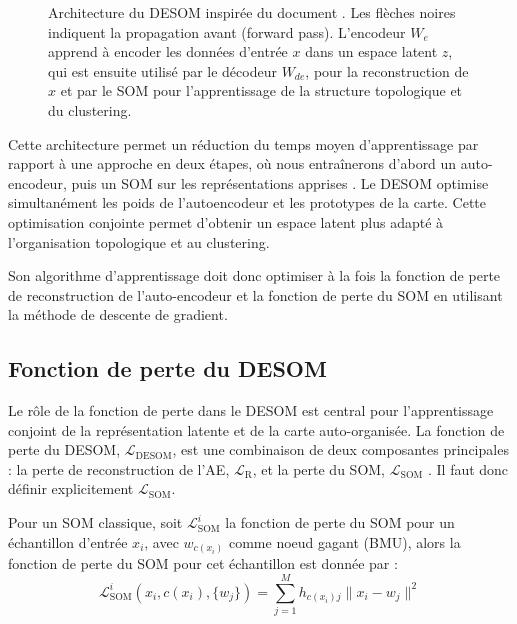 \documentclass[12pt,a4paper]{report}
\begin{document}
\begin{figure}[H]
\caption{Architecture du DESOM inspirée du document \cite{DESOM}. Les flèches noires indiquent la propagation avant (forward pass). 
L'encodeur $ W_e $ apprend à encoder les données d'entrée $x$ dans un espace latent $z$, qui est ensuite utilisé par le décodeur $ W_{de} $, 
pour la reconstruction de $x$ et par le SOM pour l'apprentissage de la structure topologique et du clustering.}
\label{fig:desom_architecture_forw}
\end{figure}

Cette architecture permet un réduction du temps moyen d'apprentissage par rapport à une approche en deux étapes, où nous entraînerons d'abord un auto-encodeur, 
puis un SOM sur les représentations apprises \cite{DESOM}. Le DESOM optimise simultanément les poids de l'autoencodeur et les prototypes de la carte. 
Cette optimisation conjointe permet d'obtenir un espace latent plus adapté à l'organisation topologique et au clustering.

Son algorithme d'apprentissage doit donc optimiser à la fois la fonction de perte de reconstruction de l'auto-encodeur et la fonction de perte du SOM en utilisant la méthode de descente de gradient.

\subsection{Fonction de perte du DESOM}

Le rôle de la fonction de perte dans le DESOM est central pour l'apprentissage conjoint de la représentation latente et de la carte auto-organisée.
La fonction de perte du DESOM, $ \mathcal{L}_{\text{DESOM}} $, est une combinaison de deux composantes principales : 
la perte de reconstruction de l'AE, $ \mathcal{L}_{\text{R}} $, et la perte du SOM, $ \mathcal{L}_{\text{SOM}} $ \cite{DESOM}. Il faut donc définir explicitement $\mathcal{L}_{\text{SOM}}$.

Pour un SOM classique, soit $\mathcal{L}_{\text{SOM}}^i$ la fonction de perte du SOM pour un échantillon d'entrée $x_i$, avec $w_{c(x_i)}$ comme noeud gagant (BMU),
alors la fonction de perte du SOM pour cet échantillon est donnée par :
$$ \mathcal{L}_{\text{SOM}}^i(x_i, c(x_i), \{w_j\}) = \sum_{j=1}^{M} h_{c(x_i) j} \| x_i - w_j \|^2 $$
\end{document}
